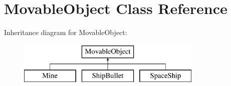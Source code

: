 \hypertarget{classMovableObject}{\section{Movable\-Object Class Reference}
\label{classMovableObject}
}
Inheritance diagram for Movable\-Object\-:\begin{figure}[H]
\begin{center}
\leavevmode
\includegraphics[height=2.000000cm]{classMovableObject}
\end{center}
\end{figure}
